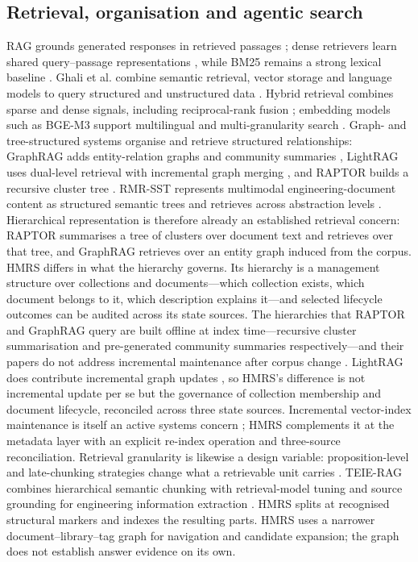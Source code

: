 \subsection{Retrieval, organisation and agentic search}
RAG grounds generated responses in retrieved passages \citep{rag-lewis}; dense
retrievers learn shared query--passage representations \citep{dpr}, while BM25
remains a strong lexical baseline \citep{bm25}. Ghali et al. combine
semantic retrieval, vector storage and language models to query structured and
unstructured data \citep{ghali-kbs-retrieval-2025}. Hybrid retrieval combines
sparse and dense signals, including reciprocal-rank fusion
\citep{rrf-cormack}; embedding models such as BGE-M3 support multilingual and
multi-granularity search \citep{bge-m3}. Graph- and tree-structured systems
organise and retrieve structured relationships: GraphRAG adds entity-relation
graphs and community summaries \citep{graphrag}, LightRAG uses dual-level
retrieval with incremental graph merging \citep{lightrag}, and RAPTOR builds a
recursive cluster tree \citep{raptor}. RMR-SST represents multimodal
engineering-document content as structured semantic trees and retrieves
across abstraction levels \citep{li-kbs-rmrsst-2026}. Hierarchical
representation is therefore already an established retrieval concern: RAPTOR summarises a tree of clusters over
document text and retrieves over that tree, and GraphRAG retrieves over an
entity graph induced from the corpus. HMRS differs in what the hierarchy
governs. Its hierarchy is a management structure over collections and
documents---which collection exists, which document belongs to it, which
description explains it---and selected lifecycle outcomes can be audited
across its state sources. The hierarchies that RAPTOR and GraphRAG query are built
offline at index time---recursive cluster summarisation and pre-generated
community summaries respectively---and their papers do not address
incremental maintenance after corpus change \cite{raptor,graphrag}. LightRAG
does contribute incremental graph updates \citep{lightrag}, so HMRS's
difference is not incremental update per se but the governance of collection
membership and document lifecycle, reconciled across three state sources.
Incremental vector-index maintenance is itself an
active systems concern \cite{singh2021freshdiskann,xu2023spfresh}; HMRS
complements it at the metadata layer with an explicit re-index operation and
three-source reconciliation. Retrieval granularity is likewise a design
variable: proposition-level and late-chunking strategies change what a
retrievable unit carries \cite{chen2024dense,gunther2024late}. TEIE-RAG
combines hierarchical semantic chunking with retrieval-model tuning and source
grounding for engineering information extraction \citep{shen-kbs-teierag-2026}.
HMRS splits at recognised structural markers and indexes the resulting parts.
HMRS uses a
narrower document--library--tag graph for navigation and candidate
expansion; the graph does not establish answer evidence on its own.

